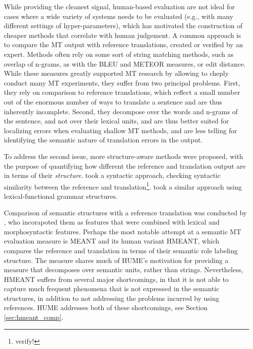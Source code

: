 \documentclass[11pt]{article}
\newcommand{\secref}[1]{Section \ref{#1}}
\newcommand{\oa}[1]{\footnote{\color{red} #1}}
\begin{document}
While providing the cleanest signal, human-based evaluation are not ideal for cases where
a wide variety of systems needs to be evaluated (e.g., with many different settings of hyper-parameters),
which has motivated the construction of cheaper methods that correlate with human
judgement. A common approach is to compare the MT output with reference translations,
created or verified by an expert. Methods often rely on some sort of string matching
methods, such as overlap of n-grams, as with the BLEU and METEOR measures, or edit
distance. While these measures greatly supported MT research by allowing to cheply
conduct many MT experiments, they suffer from two principal problems.
First, they rely on comparison to reference translations, which reflect a small
number out of the enormous number of ways to translate a sentence and are thus
inherently incomplete. Second, they decompose over the words and n-grams of the sentence,
and not over their lexical units, and are thus better suited for localizing errors
when evaluating shallow MT methods, and are less telling for identifying the semantic
nature of translation errors in the output. 

To address the second issue, more structure-aware methods were proposed, with the
purpose of quantifying how different the reference and translation output are in terms
of their {\it structure}.  took a syntactic approach, checking
syntactic similarity between the reference and translation\oa{verify!}. 
took a similar approach using lexical-functional grammar structures.

Comparison of semantic structures with a reference translation
was conducted by ,
who incorapoted them as features that were combined with lexical and morphosyntactic features.
Perhaps the most notable attempt at a semantic MT evaluation measure is MEANT \cite{lo2011meant} and
its human variant HMEANT, which compares the reference and translation in terms of their semantic
role labeling structure. The measure shares much of HUME's motivation for providing a measure that
decomposes over semantic units, rather than strings. Nevertheless, HMEANT suffers from several major
shortcomings, in that it is not able to capture much frequent phenomena that is not expressed
in the semantic structures, in addition to not addressing the problems incurred by using references.
HUME addresses both of these shortcomings, see \secref{sec:hmeant_comp}. 

\end{document}
